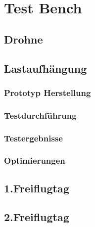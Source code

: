 \chapter{Test Bench}

\section{Drohne}

\section{Lastaufhängung}
\subsection{Prototyp Herstellung}
\subsection{Testdurchführung}
\subsection{Testergebnisse}
\subsection{Optimierungen}

\section{1.Freiflugtag}
\section{2.Freiflugtag}
